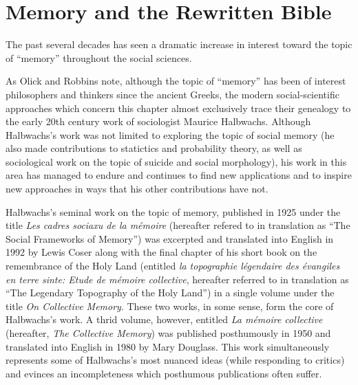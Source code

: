 \hypertarget{memory-and-the-rwb}{%
\chapter{Memory and the Rewritten Bible}\label{memory-and-the-rwb}}

The past several decades has seen a dramatic increase in interest toward
the topic of ``memory'' throughout the social sciences.

As Olick and Robbins note, although the topic of ``memory'' has been of
interest philosophers and thinkers since the ancient Greeks, the modern
social-scientific approaches which concern this chapter almost
exclusively trace their genealogy to the early 20th century work of
sociologist Maurice Halbwachs.\autocite[106]{olick-robbins_ars1998}
Although Halbwachs's work was not limited to exploring the topic of
social memory (he also made contributions to statictics and probability
theory, as well as sociological work on the topic of suicide and social
morphology\autocite[13--20]{coser_halbwachs1992}), his work in this area
has managed to endure and continues to find new applications and to
inspire new approaches in ways that his other contributions have not.

Halbwachs's seminal work on the topic of memory, published in 1925 under
the title \emph{Les cadres sociaxu de la mémoire} (hereafter refered to
in translation as ``The Social Frameworks of Memory'') was excerpted and
translated into English in 1992 by Lewis Coser along with the final
chapter of his short book on the remembrance of the Holy Land (entitled
\emph{la topographie légendaire des évangiles en terre sinte: Etude de
mémoire collective}, hereafter referred to in translation as ``The
Legendary Topography of the Holy Land'') in a single volume under the
title \emph{On Collective Memory}.\autocite{halbwachs1992} These two
works, in some sense, form the core of Halbwachs's work. A thrid volume,
however, entitled \emph{La mémoire collective} (hereafter, \emph{The
Collective Memory}) was published posthumously in 1950 and translated
into English in 1980 by Mary Douglass. This work simultaneously
represents some of Halbwachs's most nuanced ideas (while responding to
critics) and evinces an incompleteness which posthumous publications
often suffer.\autocite[Coser observes, ``One may doubt that the author
himself would have been willing to publish it in what seems to be an
unfinished state. The book nevertheless contains many further
developments of Halbwachs's thought in regard to such matters as the
relation of space and time to collective memory as well as fruitful
definitions and applications of the differences between individual,
collective, and historical memory.''][2]{coser_halbwachs1992}

